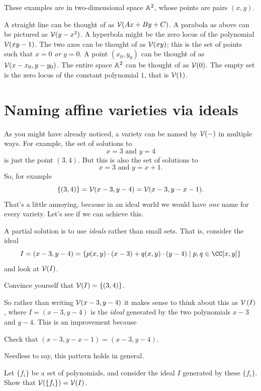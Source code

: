 \documentclass[11pt]{scrreprt}
\begin{document}
\begin{example}
	These examples are in two-dimensional space $\mathbb A^2$,
	whose points are pairs $(x,y)$.
	\begin{enumerate}[(a)]
	\ii A straight line can be thought of as $\mathcal V(Ax + By + C)$.
	\ii A parabola as above can be pictured as $\mathcal V(y-x^2)$.
	\ii A hyperbola might be the zero locus of the polynomial $\mathcal V(xy-1)$.
	\ii The two axes can be thought of as $\mathcal V(xy)$; this is the set of points
	such that $x=0$ \emph{or} $y=0$.
	\ii A point $(x_0, y_0)$ can be thought of as $\mathcal V(x-x_0, y-y_0)$.
	\ii The entire space $\mathbb A^2$ can be thought of as $\mathcal V(0)$.
	\ii The empty set is the zero locus of the constant polynomial $1$, that is $\mathcal V(1)$.
	\end{enumerate}
\end{example}

\section{Naming affine varieties via ideals}
As you might have already noticed, a variety can be named by $\mathcal V(-)$ in multiple ways.
For example, the set of solutions to
\[ x=3 \text{ and } y=4 \]
is just the point $(3,4)$.
But this is also the set of solutions to
\[ x=3 \text{ and } y=x+1. \]
So, for example
\[ \{(3,4)\}
	= \mathcal V(x-3, y-4)
	= \mathcal V(x-3, y-x-1).
	\]
That's a little annoying, because in an ideal world we would have \emph{one} name
for every variety.
Let's see if we can achieve this.

A partial solution is to use \emph{ideals} rather than small sets.
That is, consider the ideal
\[
	I = \left( x-3, y-4 \right)
	= \left\{ p(x,y) \cdot (x-3) + q(x,y) \cdot (y-4)
	\mid p,q \in \CC[x,y] \right\}
\]
and look at $\mathcal V(I)$.
\begin{ques}
	Convince yourself that $\mathcal V(I) = \{(3,4)\}$.
\end{ques}
So rather than writing $\mathcal V(x-3, y-4)$ it makes sense to
think about this as $\mathcal V\left( I \right)$, where $I = (x-3,y-4)$ is the \emph{ideal}
generated by the two polynomials $x-3$ and $y-4$.
This is an improvement because
\begin{ques}
	Check that $(x-3, y-x-1) = (x-3, y-4)$.
\end{ques}

Needless to say, this pattern holds in general.
\begin{ques}
	Let $\{f_i\}$ be a set of polynomials, and consider
	the ideal $I$ generated by these $\{f_i\}$.
	Show that $\mathcal V(\{f_i\}) = \mathcal V(I)$.
\end{ques}
\end{document}
